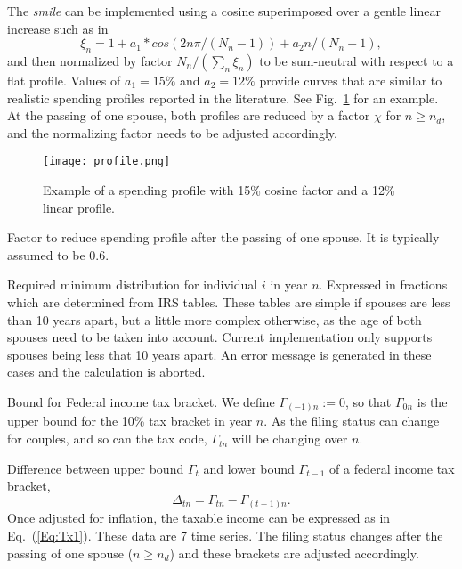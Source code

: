 \documentclass{report}[fleqn,12pt]
\begin{document}
\begin{description}[leftmargin=4em,style=multiline]
	The {\em smile} can be implemented using a cosine superimposed over a gentle linear increase
	such as in
	\begin{equation}
		\xi_n = 1 + a_1*cos(2n\pi/(N_n-1)) + a_2n/(N_n-1),
	\end{equation}
	and then normalized by factor $N_n/(\sum_n \xi_n )$ to be sum-neutral with respect to a flat profile.
	Values of $a_1 = 15\%$ and $a_2=12\%$ provide curves that are similar to realistic
        spending profiles reported in the literature. See Fig.~\ref{Fig:profile} for an example.
	At the passing of one spouse, both profiles are reduced by a factor $\chi$ for $n \ge n_d$,
	and the normalizing factor needs to be adjusted accordingly.
	\begin{figure}[t]
	    \texttt{[image: profile.png]}
	    \caption{\small Example of a spending profile with 15\% cosine factor and a 12\% linear
	    profile. \label{Fig:profile}}
	\end{figure}
\item [$\chi$]
	Factor to reduce spending profile after the passing of one spouse. It is typically
	assumed to be 0.6.
\item [$\rho_{in}$]
	Required minimum distribution for individual $i$ in year $n$. Expressed in fractions
	which are determined from IRS tables. These tables are simple if spouses are less than 10 years apart,
	but a little more complex otherwise, as the age of both spouses need to be taken into account.
	Current implementation only supports spouses being less that 10 years apart.
	An error message is generated in these cases and the calculation is aborted.
\item [$\Gamma_{tn}$]
	Bound for Federal income tax bracket. We define $\Gamma_{(-1)n} := 0$, so that
	$\Gamma_{0n}$ is the upper bound for the 10\% tax bracket in year $n$. As the filing status
	can change for couples, and so can the tax code, $\Gamma_{tn}$ will be changing over $n$.
\item [$\Delta_{tn}$]
	Difference between upper bound $\Gamma_t$ and lower bound $\Gamma_{t-1}$
	of a federal income tax bracket,
	\begin{equation}
		\Delta_{tn} = \Gamma_{tn} - \Gamma_{(t-1)n}.
	\end{equation}
	Once adjusted for inflation,
	the taxable income can be expressed as in Eq.~(\ref{Eq:Tx1}). These data are 7 time series.
	The filing status changes after the passing of one spouse ($n \ge n_d$) and these
	brackets are adjusted accordingly.
\item [$\theta_{tn}$]

\end{description}
\end{document}
